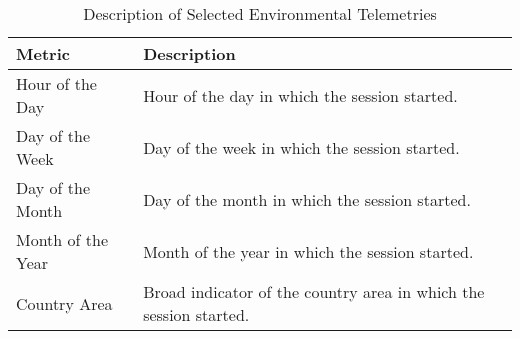 \begin{table}[H] \centering
\caption{Description of Selected Environmental Telemetries}
\label{metricsdescription_env_3}
  \begin{tabularx}{\textwidth}{@{}lX@{}}
    \toprule
    \textbf{Metric}      & \textbf{Description}          \\ \midrule
    {Hour of the Day}    & Hour of the day in which the session started.  \\
    {Day of the Week}     & Day of the week in which the session started.       \\ 
    {Day of the Month}      & Day of the month in which the session started.\\ 
    {Month of the Year}    & Month of the year in which the session started. \\
    {Country Area}    & Broad indicator of the country area in which the session started. \\ 
    \bottomrule
  \end{tabularx}
\end{table}